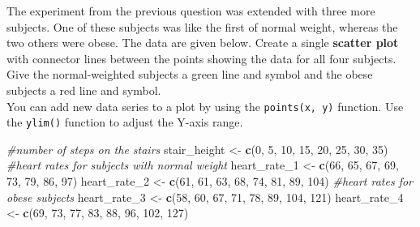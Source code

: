 \documentclass[]{book}
\newenvironment{Shaded}{\begin{snugshade}}{\end{snugshade}}
\newcommand{\CommentTok}[1]{\textcolor[rgb]{0.56,0.35,0.01}{\textit{#1}}}
\newcommand{\DecValTok}[1]{\textcolor[rgb]{0.00,0.00,0.81}{#1}}
\newcommand{\KeywordTok}[1]{\textcolor[rgb]{0.13,0.29,0.53}{\textbf{#1}}}
\newcommand{\NormalTok}[1]{#1}
\newcommand{\StringTok}[1]{\textcolor[rgb]{0.31,0.60,0.02}{#1}}
\begin{document}
The experiment from the previous question was extended with three more subjects. One of these subjects was like the first of normal weight, whereas the two others were obese. The data are given below. Create a single \textbf{scatter plot} with connector lines between the points showing the data for all four subjects. Give the normal-weighted subjects a green line and symbol and the obese subjects a red line and symbol.\\
You can add new data series to a plot by using the \texttt{points(x,\ y)} function. Use the \texttt{ylim()} function to adjust the Y-axis range.

\begin{Shaded}
\begin{Highlighting}[]
\CommentTok{#number of steps on the stairs}
\NormalTok{stair_height <-}\StringTok{ }\KeywordTok{c}\NormalTok{(}\DecValTok{0}\NormalTok{, }\DecValTok{5}\NormalTok{, }\DecValTok{10}\NormalTok{, }\DecValTok{15}\NormalTok{, }\DecValTok{20}\NormalTok{, }\DecValTok{25}\NormalTok{, }\DecValTok{30}\NormalTok{, }\DecValTok{35}\NormalTok{)}
\CommentTok{#heart rates for subjects with normal weight}
\NormalTok{heart_rate_}\DecValTok{1}\NormalTok{ <-}\StringTok{ }\KeywordTok{c}\NormalTok{(}\DecValTok{66}\NormalTok{, }\DecValTok{65}\NormalTok{, }\DecValTok{67}\NormalTok{, }\DecValTok{69}\NormalTok{, }\DecValTok{73}\NormalTok{, }\DecValTok{79}\NormalTok{, }\DecValTok{86}\NormalTok{, }\DecValTok{97}\NormalTok{)}
\NormalTok{heart_rate_}\DecValTok{2}\NormalTok{ <-}\StringTok{ }\KeywordTok{c}\NormalTok{(}\DecValTok{61}\NormalTok{, }\DecValTok{61}\NormalTok{, }\DecValTok{63}\NormalTok{, }\DecValTok{68}\NormalTok{, }\DecValTok{74}\NormalTok{, }\DecValTok{81}\NormalTok{, }\DecValTok{89}\NormalTok{, }\DecValTok{104}\NormalTok{)}
\CommentTok{#heart rates for obese subjects}
\NormalTok{heart_rate_}\DecValTok{3}\NormalTok{ <-}\StringTok{ }\KeywordTok{c}\NormalTok{(}\DecValTok{58}\NormalTok{, }\DecValTok{60}\NormalTok{, }\DecValTok{67}\NormalTok{, }\DecValTok{71}\NormalTok{, }\DecValTok{78}\NormalTok{, }\DecValTok{89}\NormalTok{, }\DecValTok{104}\NormalTok{, }\DecValTok{121}\NormalTok{)}
\NormalTok{heart_rate_}\DecValTok{4}\NormalTok{ <-}\StringTok{ }\KeywordTok{c}\NormalTok{(}\DecValTok{69}\NormalTok{, }\DecValTok{73}\NormalTok{, }\DecValTok{77}\NormalTok{, }\DecValTok{83}\NormalTok{, }\DecValTok{88}\NormalTok{, }\DecValTok{96}\NormalTok{, }\DecValTok{102}\NormalTok{, }\DecValTok{127}\NormalTok{)}
\end{Highlighting}
\end{Shaded}
\end{document}
